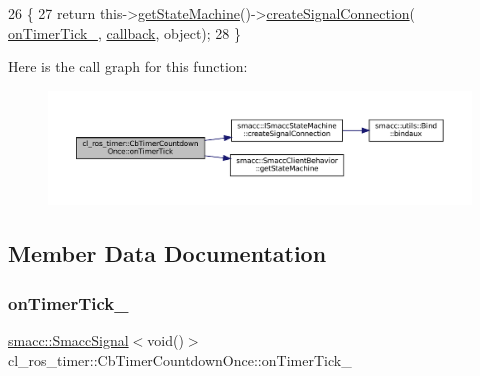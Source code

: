 \begin{DoxyCode}
26     \{
27         \textcolor{keywordflow}{return} this->\hyperlink{classsmacc_1_1SmaccClientBehavior_aa817da149f366f6a28794c04eb0744b0}{getStateMachine}()->\hyperlink{classsmacc_1_1ISmaccStateMachine_adf0f42ade0c65cc471960fe2a7c42da2}{createSignalConnection}(
      \hyperlink{classcl__ros__timer_1_1CbTimerCountdownOnce_ac948b5efd5c9a397319668378463eadd}{onTimerTick\_}, \hyperlink{servers_2opencv__perception__node_2opencv__perception__node_8cpp_a050e697bd654facce10ea3f6549669b3}{callback}, \textcolor{keywordtype}{object});
28     \}
\end{DoxyCode}
Here is the call graph for this function\+:
\nopagebreak
\begin{figure}[H]
\begin{center}
\leavevmode
\includegraphics[width=350pt]{classcl__ros__timer_1_1CbTimerCountdownOnce_a1e20a8c9a9907db8a1d7dacf8c60ad27_cgraph}
\end{center}
\end{figure}


\subsection{Member Data Documentation}
\mbox{\label{classcl__ros__timer_1_1CbTimerCountdownOnce_ac948b5efd5c9a397319668378463eadd}} 
\subsubsection{\texorpdfstring{on\+Timer\+Tick\+\_\+}{onTimerTick\_}}
{\footnotesize\ttfamily \hyperlink{classsmacc_1_1SmaccSignal}{smacc\+::\+Smacc\+Signal}$<$void()$>$ cl\+\_\+ros\+\_\+timer\+::\+Cb\+Timer\+Countdown\+Once\+::on\+Timer\+Tick\+\_\+\hspace{0.3cm}{\ttfamily [private]}}



